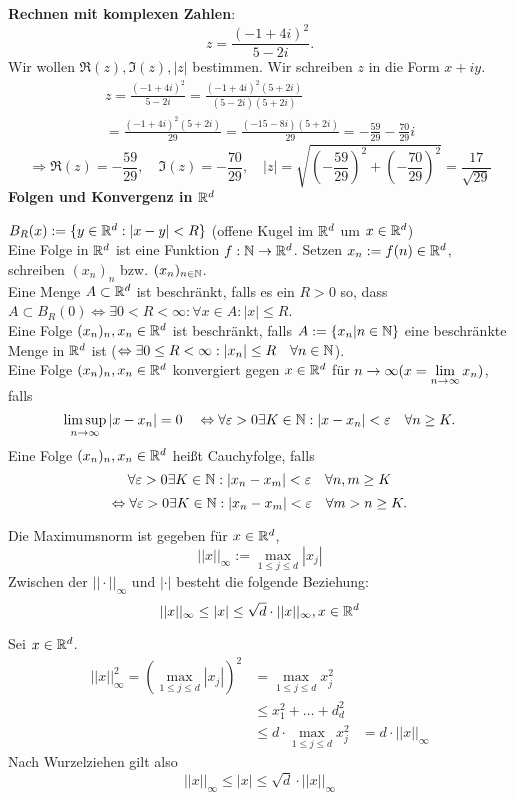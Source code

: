 \documentclass[../ana1.tex]{subfiles}
\begin{document}
\textbf{Rechnen mit komplexen Zahlen}:
\[ z = \frac{(-1 + 4i)^2}{5-2i}. \] Wir wollen \( \Re(z), \Im(z), |z| \) bestimmen.
Wir schreiben \(z\) in die Form \(x+iy\).
\begin{align*}
	z = \frac{(-1 + 4i)^2}{5-2i} = \frac{(-1 + 4i)^2(5+2i)}{(5-2i)(5+2i)}\\
	= \frac{(-1 + 4i)^2(5+2i)}{29} = \frac{(-15-8i)(5+2i)}{29} = -\frac{59}{29} - \frac{70}{29}i
\end{align*}
\[ \Rightarrow \Re(z) = -\frac{59}{29},\quad \Im(z) = -\frac{70}{29},\quad |z| = \sqrt{ \left(-\frac{59}{29}\right)^2 + \left(-\frac{70}{29}\right)^2 } = \frac{17}{\sqrt{29}} \]
\textbf{Folgen und Konvergenz in \(\mathbb{R}^d\)}
\begin{defi}
	\( B_R(x) := \{ y\in\mathbb{R}^d : |x-y| < R \} \) (offene Kugel im \(\mathbb{R}^d\) um \( x\in\mathbb{R}^d \))
	\\%
	Eine Folge in \( \mathbb{R}^d \) ist eine Funktion \( f: \mathbb{N} \rightarrow \mathbb{R}^d \). Setzen \(x_n := f(n)\in\mathbb{R}^d \), schreiben \( (x_n)_n \) bzw. \((x_n)_{n\in\mathbb{N}}\).\\
	Eine Menge \( A\subset \mathbb{R}^d \) ist beschränkt, falls es ein \(R > 0\) so, dass \( A\subset B_R(0) \Leftrightarrow \exists 0<R<\infty:\forall x\in A: |x|\leq R \).\\
	Eine Folge \( (x_n)_n, x_n\in\mathbb{R}^d \) ist beschränkt, falls \(A := \{ x_n | n\in\mathbb{N} \}\) eine beschränkte Menge in \( \mathbb{R}^d \) ist (\( \Leftrightarrow \exists 0\leq R < \infty: |x_n| \leq R \quad \forall n\in\mathbb{N} \)).\\
	Eine Folge \( (x_n)_n, x_n\in\mathbb{R}^d \) konvergiert gegen \( x\in\mathbb{R}^d \) für \( n\rightarrow \infty (x=\lim\limits_{n\rightarrow\infty} x_n) \), falls 
	\[ \limsup\limits_{n\rightarrow\infty} |x-x_n| = 0 \quad \Leftrightarrow \forall \varepsilon > 0 \exists K\in\mathbb{N}: |x-x_n| < \varepsilon \quad \forall n\geq K. \]
	Eine Folge \( (x_n)_n, x_n\in\mathbb{R}^d \) heißt Cauchyfolge, falls 
	\[ \forall \varepsilon>0 \exists K\in\mathbb{N}: |x_n - x_m| < \varepsilon \quad \forall n,m\geq K \]
	\[ \Leftrightarrow \forall \varepsilon > 0 \exists K\in\mathbb{N}: |x_n-x_m| < \varepsilon \quad \forall m>n\geq K. \]
\end{defi}
\begin{bem}
	Die Maximumsnorm ist gegeben für \(x\in\mathbb{R}^d\),
	\[ ||x||_\infty := \underset{1\leq j\leq d}{\max} |x_j| \]
	Zwischen der \( ||\cdot||_\infty \) und \( |\cdot| \) besteht die folgende Beziehung:
	\[ ||x||_\infty \leq |x| \leq \sqrt{d} \cdot ||x||_\infty, x\in\mathbb{R}^d \]
\end{bem}
\begin{bew}
	Sei \(x\in\mathbb{R}^d\).
	\begin{align*}
		||x||_\infty^2 = ( \underset{1\leq j\leq d}{\max} |x_j| )^2 &= \underset{1\leq j\leq d}{\max} x_j^2\\
		&\leq x_1^2 + \dots + d_d^2\\
		&\leq d \cdot \underset{1\leq j\leq d}{\max} x_j^2
		&= d \cdot ||x||_\infty
	\end{align*}
	Nach Wurzelziehen gilt also
	\[ ||x||_\infty \leq |x| \leq \sqrt{d} \cdot ||x||_\infty \]
\end{bew}
\end{document}
